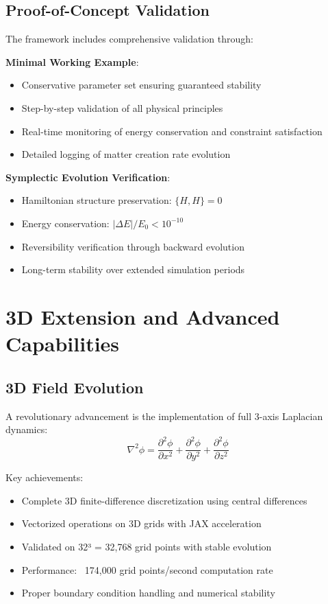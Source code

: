 \documentclass[11pt]{article}
\begin{document}
\subsection{Proof-of-Concept Validation}

The framework includes comprehensive validation through:

\textbf{Minimal Working Example}:
\begin{itemize}
\item Conservative parameter set ensuring guaranteed stability
\item Step-by-step validation of all physical principles
\item Real-time monitoring of energy conservation and constraint satisfaction
\item Detailed logging of matter creation rate evolution
\end{itemize}

\textbf{Symplectic Evolution Verification}:
\begin{itemize}
\item Hamiltonian structure preservation: $\{H, H\} = 0$
\item Energy conservation: $|\Delta E|/E_0 < 10^{-10}$
\item Reversibility verification through backward evolution
\item Long-term stability over extended simulation periods
\end{itemize}

\section{3D Extension and Advanced Capabilities}

\subsection{3D Field Evolution}

A revolutionary advancement is the implementation of full 3-axis Laplacian dynamics:
\begin{equation}
\nabla^2\phi = \frac{\partial^2\phi}{\partial x^2} + \frac{\partial^2\phi}{\partial y^2} + \frac{\partial^2\phi}{\partial z^2}
\end{equation}

Key achievements:
\begin{itemize}
\item Complete 3D finite-difference discretization using central differences
\item Vectorized operations on 3D grids with JAX acceleration
\item Validated on 32³ = 32,768 grid points with stable evolution
\item Performance: ~174,000 grid points/second computation rate
\item Proper boundary condition handling and numerical stability
\end{itemize}
\end{document}
